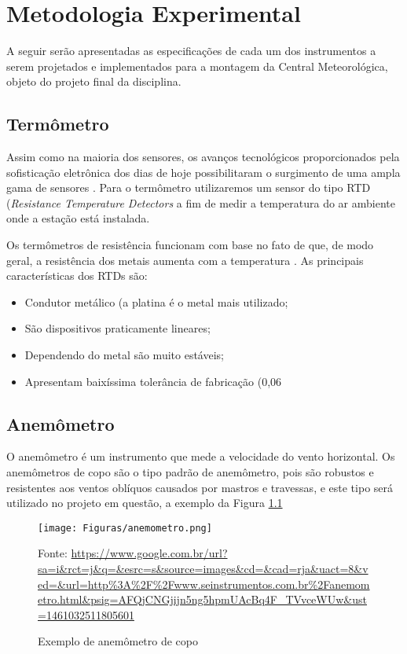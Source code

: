 \documentclass[12pt,a4paper]{instrumentacao}
\begin{document}
\chapter{Metodologia Experimental}
A seguir serão apresentadas as especificações de cada um dos instrumentos a serem projetados e implementados para a montagem da Central Meteorológica, objeto do projeto final da disciplina.

\section{Termômetro}
Assim como na maioria dos sensores, os avanços tecnológicos proporcionados pela sofisticação eletrônica dos dias de hoje possibilitaram o surgimento de uma ampla gama de sensores \cite{livro-texto}. Para o termômetro utilizaremos um sensor do tipo RTD (\textit{Resistance Temperature Detectors} a fim de medir a temperatura do ar ambiente onde a estação está instalada.

Os termômetros de resistência funcionam com base no fato de que, de modo geral, a resistência dos metais aumenta com a temperatura \cite{livro-texto}. As principais características dos RTDs são:

\begin{itemize}
	\item Condutor metálico (a platina é o metal mais utilizado;
	\item São dispositivos praticamente lineares;
	\item Dependendo do metal são muito estáveis;
	\item Apresentam baixíssima tolerância de fabricação (0,06%

\end{itemize}

\section{Anemômetro}
O anemômetro é um instrumento que mede a velocidade do vento horizontal. Os anemômetros de copo são o tipo padrão de anemômetro, pois são robustos e resistentes aos ventos oblíquos causados por mastros e travessas, e este tipo será utilizado no projeto em questão, a exemplo da Figura \ref{fig:anemometro}

\begin{figure}[h]
	\centering
		\texttt{[image: Figuras/anemometro.png]}
	\caption{Exemplo de anemômetro de copo}
	Fonte: \url{https://www.google.com.br/url?sa=i&rct=j&q=&esrc=s&source=images&cd=&cad=rja&uact=8&ved=&url=http\%3A\%2F\%2Fwww.seinstrumentos.com.br\%2Fanemometro.html&psig=AFQjCNGjijn5ng5hpmUAcBq4F_TVvceWUw&ust=1461032511805601}
	\label{fig:anemometro}
\end{figure}
\end{document}
